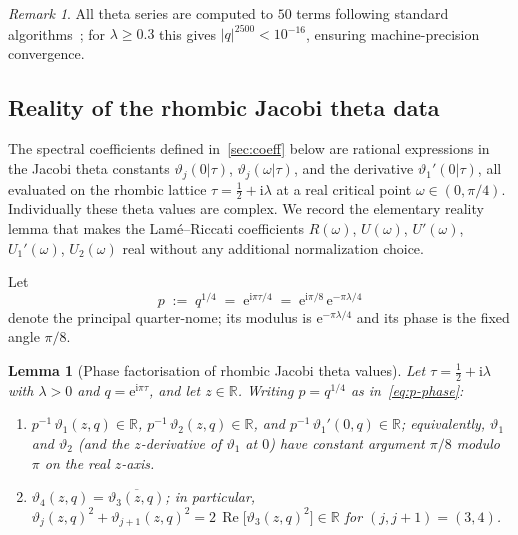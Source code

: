 \documentclass[11pt,a4paper]{article}
\theoremstyle{plain}
\newtheorem{lemma}[theorem]{Lemma}
\theoremstyle{definition}
\theoremstyle{remark}
\newtheorem{remark}[theorem]{Remark}
\DeclareMathOperator{\Real}{Re}
\newcommand{\vt}[1]{\vartheta_{#1}}     %
\newcommand{\RR}{\mathbb{R}}
\newcommand{\ee}{\mathrm{e}}
\newcommand{\ii}{\mathrm{i}}
\newcommand{\abs}[1]{\lvert #1 \rvert}
\begin{document}
\begin{remark}
  All theta series are computed to $50$ terms following
  standard algorithms~\cite{Dee11}; for
  $\lambda \geq 0.3$ this gives $\abs{q}^{2500} < 10^{-16}$, ensuring
  machine-precision convergence.
\end{remark}

\subsection{Reality of the rhombic Jacobi theta data}
\label{sec:theta-reality}

The spectral coefficients defined in~\cref{sec:coeff} below are
rational expressions in the Jacobi theta constants
$\vt{j}(0|\tau)$, $\vt{j}(\omega|\tau)$, and the derivative
$\vt{1}'(0|\tau)$, all evaluated on the rhombic lattice
$\tau = \tfrac12 + \ii\lambda$ at a real critical point
$\omega \in (0,\pi/4)$. Individually these theta values are complex.
We record the elementary reality lemma that makes the Lam\'e--Riccati
coefficients $R(\omega)$, $U(\omega)$, $U'(\omega)$, $U_1'(\omega)$,
$U_2(\omega)$ real without any additional normalization choice.

Let
\begin{equation}
  p \;:=\; q^{1/4} \;=\; \ee^{\ii\pi\tau/4}
  \;=\; \ee^{\ii\pi/8}\,\ee^{-\pi\lambda/4}
  \label{eq:p-phase}
\end{equation}
denote the principal quarter-nome; its modulus is $\ee^{-\pi\lambda/4}$
and its phase is the fixed angle $\pi/8$.

\begin{lemma}[Phase factorisation of rhombic Jacobi theta values]
\label{lem:rhombic-parity}
Let $\tau = \tfrac12 + \ii\lambda$ with $\lambda > 0$ and
$q = \ee^{\ii\pi\tau}$, and let $z \in \RR$.
Writing $p = q^{1/4}$ as in~\eqref{eq:p-phase}:
\begin{enumerate}[label=(\roman*),nosep]
\item\label{item:p-factor}
  $p^{-1}\,\vt{1}(z,q) \in \RR$,
  $p^{-1}\,\vt{2}(z,q) \in \RR$, and
  $p^{-1}\,\vt{1}'(0,q) \in \RR$; equivalently, $\vt{1}$ and
  $\vt{2}$ (and the $z$-derivative of $\vt{1}$ at $0$) have constant
  argument $\pi/8$ modulo $\pi$ on the real $z$-axis.
\item\label{item:conj-swap}
  $\vt{4}(z,q) = \overline{\vt{3}(z,q)}$; in particular,
  $\vt{j}(z,q)^2 + \vt{j+1}(z,q)^2 = 2\,\Real\bigl[\vt{3}(z,q)^2\bigr] \in \RR$
  for $(j,j{+}1) = (3,4)$.
\end{enumerate}
\end{lemma}
\end{document}

